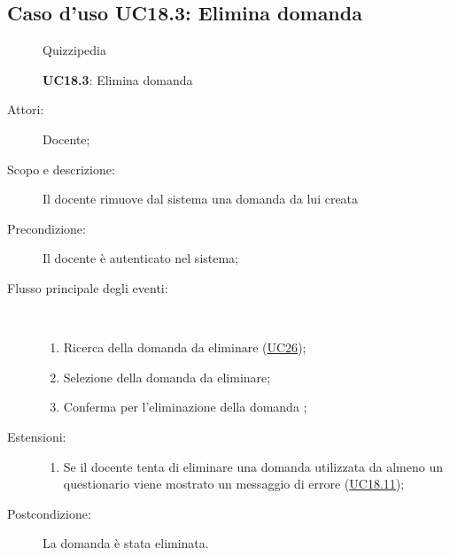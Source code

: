 \subsection{Caso d'uso UC18.3: Elimina domanda}
	\begin{figure}[H]
		\centering
		\begin{resizedtikzpicture}{\textwidth}
		\begin{umlsystem}[x=0, fill=lightgray!20]{Quizzipedia}
		\end{umlsystem}
		\end{resizedtikzpicture}
		\caption{\textbf{UC18.3}: Elimina domanda}
		\label{UC18.3}
	\end{figure}
\begin{description}
\item[Attori:] Docente;
\item[Scopo e descrizione:] Il docente rimuove dal sistema una domanda da lui creata
      \item[Precondizione:] Il docente è autenticato nel sistema;

        \item[Flusso principale degli eventi:] \ 
 \begin{enumerate}
          \item Ricerca della domanda da eliminare (\hyperlink{UC26}{UC26});
          \item Selezione della domanda da eliminare;
          \item Conferma per l'eliminazione della domanda	;

      \end{enumerate}
    \item[Estensioni:]
      \begin{enumerate}
          \item Se il docente tenta di eliminare una domanda utilizzata da almeno un questionario viene mostrato un messaggio di errore (\hyperlink{UC18.11}{UC18.11});

      \end{enumerate}
    \item[Postcondizione:] La domanda è stata eliminata.
  \end{description}
\hypertarget{UC18.4}{}
